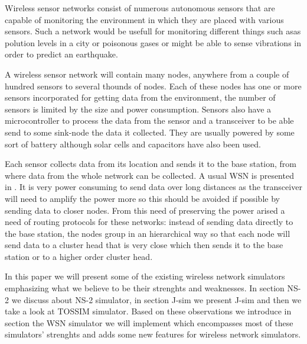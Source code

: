 
Wireless sensor networks consist of numerous autonomous sensors that are
capable of monitoring the environment in which they are placed with various
sensors. Such a network would be usefull for monitoring different things such
asas polution levels
in a city or poisonous gases or might be able to sense vibrations in order 
to predict an earthquake. 

A wireless sensor network will contain many nodes, anywhere from a couple of
hundred sensors to several thounds of nodes. Each of these nodes has one or
more sensors incorporated for getting data from the environment, the number of
sensors is limited
by the size and power consumption. Sensors also have a microcontroller 
to process the data from the sensor and a transceiver to be able send to some 
sink-node the data it collected. They are usually powered by some sort of battery 
although solar cells and capacitors have also been used.

Each sensor collects data from its location and sends it to the base station,
from where data from the whole network can be collected. A usual WSN is
presented in . It is very power
consuming to send data over long distances as the transceiver will need to
amplify the power more so this should be avoided if possible by sending data to
closer nodes. From this need of preserving the power 
arised a need of routing protocols for these
networks: instead of sending data directly to the base station, the nodes
group in an hierarchical way so that each node will send data to a cluster
head that is very close which then sends it to the base station or to a higher
order cluster head.


In this paper we will present some of the existing wireless network
simulators emphasizing what we believe to be their strenghts and weaknesses. 
In section NS-2 we discuss about NS-2 simulator, in section J-sim we present
J-sim and then we take a look at TOSSIM simulator. Based on these observations
we introduce in section \codename  the WSN simulator we will implement which
encompasses most of these simulators' strenghts and adds some new features
for wireless network simulators.
